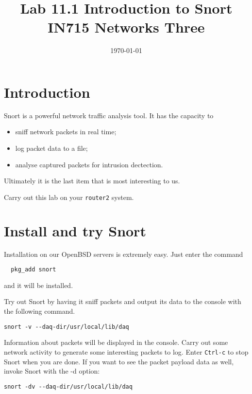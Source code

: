\documentclass{article}
\begin{document}
\title{ Lab 11.1 Introduction to Snort\\ IN715 Networks Three}
\date{\today}
\maketitle

\section*{Introduction}
Snort is a powerful network traffic analysis tool.  It has the capacity to 

\begin{itemize}
		 \item sniff network packets in real time;
		 \item log packet data to a file;
		 \item analyse captured packets for intrusion dectection.
	 \end{itemize}

Ultimately it is the last item that is most interesting to us.

Carry out this lab on your \texttt{router2} system.

\section{Install and try Snort}
Installation on our OpenBSD servers is extremely easy.  Just enter the command

\begin{verbatim}
  pkg_add snort
\end{verbatim}

and it will be installed.

Try out Snort by having it sniff packets and output its data to the console with the following command.

\begin{verbatim}
snort -v --daq-dir/usr/local/lib/daq
\end{verbatim}

Information about packets will be displayed in the console. Carry out some network activity to generate some interesting packets to log.  Enter \texttt{Ctrl-c} to stop Snort when you are done.  If you want to see the packet payload data as well, invoke Snort with the -d option:


\begin{verbatim}
snort -dv --daq-dir/usr/local/lib/daq
\end{verbatim}
\end{document}
